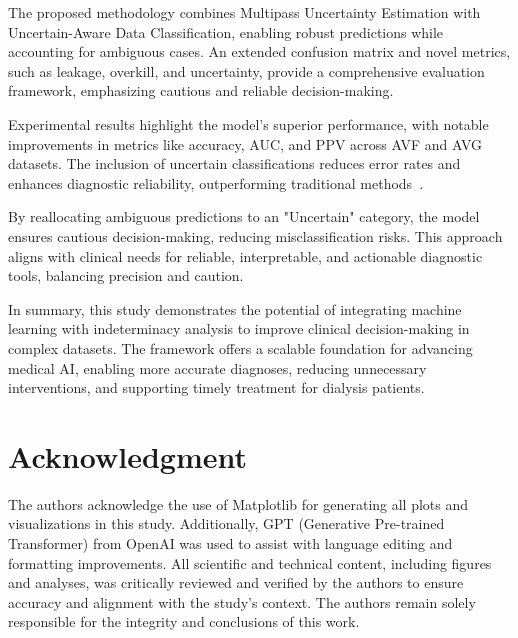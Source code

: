 \documentclass{ieeeaccess}
\begin{document}
The proposed methodology combines Multipass Uncertainty Estimation with Uncertain-Aware Data Classification, enabling robust predictions while accounting for ambiguous cases. An extended confusion matrix and novel metrics, such as leakage, overkill, and uncertainty, provide a comprehensive evaluation framework, emphasizing cautious and reliable decision-making.

Experimental results highlight the model's superior performance, with notable improvements in metrics like accuracy, AUC, and PPV across AVF and AVG datasets. The inclusion of uncertain classifications reduces error rates and enhances diagnostic reliability, outperforming traditional methods~\cite{Wu}.

By reallocating ambiguous predictions to an "Uncertain" category, the model ensures cautious decision-making, reducing misclassification risks. This approach aligns with clinical needs for reliable, interpretable, and actionable diagnostic tools, balancing precision and caution.

In summary, this study demonstrates the potential of integrating machine learning with indeterminacy analysis to improve clinical decision-making in complex datasets. The framework offers a scalable foundation for advancing medical AI, enabling more accurate diagnoses, reducing unnecessary interventions, and supporting timely treatment for dialysis patients.





\section*{Acknowledgment}

The authors acknowledge the use of Matplotlib for generating all plots and visualizations in this study. Additionally, GPT (Generative Pre-trained Transformer) from OpenAI was used to assist with language editing and formatting improvements. All scientific and technical content, including figures and analyses, was critically reviewed and verified by the authors to ensure accuracy and alignment with the study's context. The authors remain solely responsible for the integrity and conclusions of this work.
\end{document}
